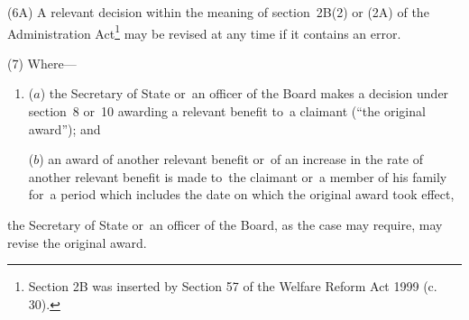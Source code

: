 \documentclass[12pt,a4paper]{article}
\begin{document}
(6A) A relevant decision within the meaning of section~2B(2) 
or (2A)  %
of the Administration Act\footnote{\frenchspacing Section 2B was inserted by Section 57 of the Welfare Reform Act 1999 (c. 30).} may be revised at any time if it contains an error.

%

%

(7) Where—
\begin{enumerate}\item[]
($a$) the Secretary of State or~an officer of the Board makes a decision under section~8 or~10 awarding a relevant benefit to~a claimant (“the original award”); and

($b$) an award of another relevant benefit or~of an increase in the rate of another relevant benefit is made to~the claimant or~a member of his family for~a period which includes the date on which the original award took effect,
\end{enumerate}
the Secretary of State or~an officer of the Board, as the case may require, may revise the original award.
\end{document}
